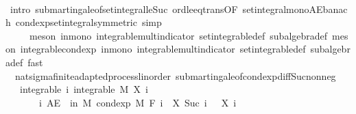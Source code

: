 \begin{isabellebody}
\ \ \isamarkupfalse%
\ {\isacharparenleft}{\kern0pt}intro\ submartingale{\isacharunderscore}{\kern0pt}of{\isacharunderscore}{\kern0pt}set{\isacharunderscore}{\kern0pt}integral{\isacharunderscore}{\kern0pt}le{\isacharunderscore}{\kern0pt}Suc\ ord{\isacharunderscore}{\kern0pt}le{\isacharunderscore}{\kern0pt}eq{\isacharunderscore}{\kern0pt}trans{\isacharbrackleft}{\kern0pt}OF\ set{\isacharunderscore}{\kern0pt}integral{\isacharunderscore}{\kern0pt}mono{\isacharunderscore}{\kern0pt}AE{\isacharunderscore}{\kern0pt}banach\ cond{\isacharunderscore}{\kern0pt}exp{\isacharunderscore}{\kern0pt}set{\isacharunderscore}{\kern0pt}integral{\isacharbrackleft}{\kern0pt}symmetric{\isacharbrackright}{\kern0pt}{\isacharbrackright}{\kern0pt}{\isacharcomma}{\kern0pt}\ simp{\isacharparenright}{\kern0pt}\isanewline
\ \ \ \ \ {\isacharparenleft}{\kern0pt}meson\ in{\isacharunderscore}{\kern0pt}mono\ integrable{\isacharunderscore}{\kern0pt}mult{\isacharunderscore}{\kern0pt}indicator\ set{\isacharunderscore}{\kern0pt}integrable{\isacharunderscore}{\kern0pt}def\ subalgebra{\isacharunderscore}{\kern0pt}def{\isacharcomma}{\kern0pt}\ meson\ integrable{\isacharunderscore}{\kern0pt}cond{\isacharunderscore}{\kern0pt}exp\ in{\isacharunderscore}{\kern0pt}mono\ integrable{\isacharunderscore}{\kern0pt}mult{\isacharunderscore}{\kern0pt}indicator\ set{\isacharunderscore}{\kern0pt}integrable{\isacharunderscore}{\kern0pt}def\ subalgebra{\isacharunderscore}{\kern0pt}def{\isacharcomma}{\kern0pt}\ fast{\isacharplus}{\kern0pt}{\isacharparenright}{\kern0pt}%
\endisatagproof
{\isafoldproof}%
%
\isadelimproof
\isanewline
%
\endisadelimproof
\isanewline
{}\isamarkupfalse%
\ {\isacharparenleft}{\kern0pt}\ nat{\isacharunderscore}{\kern0pt}sigma{\isacharunderscore}{\kern0pt}finite{\isacharunderscore}{\kern0pt}adapted{\isacharunderscore}{\kern0pt}process{\isacharunderscore}{\kern0pt}linorder{\isacharparenright}{\kern0pt}\ submartingale{\isacharunderscore}{\kern0pt}of{\isacharunderscore}{\kern0pt}cond{\isacharunderscore}{\kern0pt}exp{\isacharunderscore}{\kern0pt}diff{\isacharunderscore}{\kern0pt}Suc{\isacharunderscore}{\kern0pt}nonneg{\isacharcolon}{\kern0pt}\isanewline
\ \ \ integrable{\isacharcolon}{\kern0pt}\ {\isachardoublequoteopen}{\isasymAnd}i{\isachardot}{\kern0pt}\ integrable\ M\ {\isacharparenleft}{\kern0pt}X\ i{\isacharparenright}{\kern0pt}{\isachardoublequoteclose}\ \isanewline
\ \ \ \ \ \ \ {\isachardoublequoteopen}{\isasymAnd}i{\isachardot}{\kern0pt}\ AE\ {\isasymxi}\ in\ M{\isachardot}{\kern0pt}\ cond{\isacharunderscore}{\kern0pt}exp\ M\ {\isacharparenleft}{\kern0pt}F\ i{\isacharparenright}{\kern0pt}\ {\isacharparenleft}{\kern0pt}{\isasymlambda}{\isasymxi}{\isachardot}{\kern0pt}\ X\ {\isacharparenleft}{\kern0pt}Suc\ i{\isacharparenright}{\kern0pt}\ {\isasymxi}\ {\isacharminus}{\kern0pt}\ X\ i\ {\isasymxi}{\isacharparenright}{\kern0pt}\ {\isasymxi}\ {\isasymge}\ {}{\isachardoublequoteclose}\ \isanewline

\end{isabellebody}
